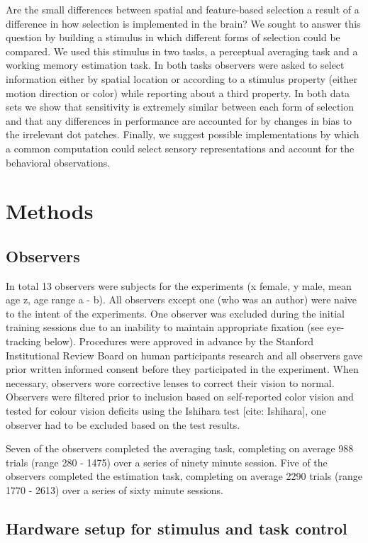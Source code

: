Are the small differences between spatial and feature-based selection a result of a difference in how selection is implemented in the brain? We sought to answer this question by building a stimulus in which different forms of selection could be compared. We used this stimulus in two tasks, a perceptual averaging task and a working memory estimation task. In both tasks observers were asked to select information either by spatial location or according to a stimulus property (either motion direction or color) while reporting about a third property. In both data sets we show that sensitivity is extremely similar between each form of selection and that any differences in performance are accounted for by changes in bias to the irrelevant dot patches. Finally, we suggest possible implementations by which a common computation could select sensory representations and account for the behavioral observations.

\section{Methods}

\subsection{Observers}
In total 13 observers were subjects for the experiments (x female, y male, mean age z, age range a - b). All observers except one (who was an author) were naive to the intent of the experiments. One observer was excluded during the initial training sessions due to an inability to maintain appropriate fixation (see eye-tracking below). Procedures were approved in advance by the Stanford Institutional Review Board on human participants research and all observers gave prior written informed consent before they participated in the experiment. When necessary, observers wore corrective lenses to correct their vision to normal. Observers were filtered prior to inclusion based on self-reported color vision and tested for colour vision deficits using the Ishihara test [cite: Ishihara], one observer had to be excluded based on the test results.

Seven of the observers completed the averaging task, completing on average 988 trials (range 280 - 1475) over a series of ninety minute session. Five of the observers completed the estimation task, completing on average 2290 trials (range 1770 - 2613) over a series of sixty minute sessions. 

\subsection{Hardware setup for stimulus and task control}

